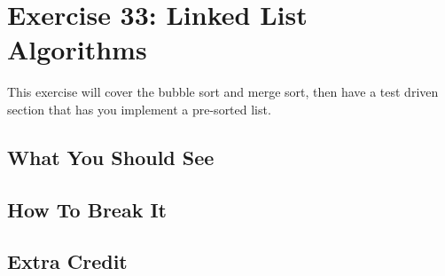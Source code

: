 \chapter{Exercise 33: Linked List Algorithms}

This exercise will cover the bubble sort and merge sort, then have a test driven section that
has you implement a pre-sorted list.

\section{What You Should See}


\section{How To Break It}


\section{Extra Credit}



